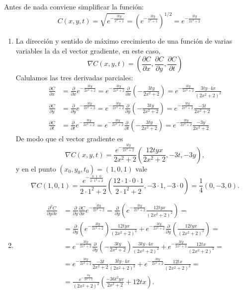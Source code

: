 {Antes de nada conviene simplificar la función:
\[
C(x,y,t) = \sqrt{e^{-\frac{3ty}{x^2+1}}} = \left(e^{-\frac{3ty}{x^2+1}}\right)^{1/2} = e^{-\frac{3ty}{2x^2+2}}
\]
\begin{enumerate}
\item La dirección y sentido de máximo crecimiento de una función de varias variables la da el vector gradiente, en este caso,
\[
\nabla C(x,y,t) =\left(\frac{\partial C}{\partial x}, \frac{\partial C}{\partial y}, \frac{\partial C}{\partial t} \right)
\]
Calulamos las tres derivadas parciales:
\begin{align*}
\frac{\partial C}{\partial x} &= \frac{\partial}{\partial x} e^{-\frac{3ty}{2x^2+2}} = e^{-\frac{3ty}{2x^2+2}} \frac{\partial}{\partial x}\left(-\frac{3ty}{2x^2+2}\right) = e^{-\frac{3ty}{2x^2+2}}\frac{3ty\cdot 4x}{(2x^2+2)^2} \\
\frac{\partial C}{\partial y} &= \frac{\partial}{\partial y} e^{-\frac{3ty}{2x^2+2}} = e^{-\frac{3ty}{2x^2+2}} \frac{\partial}{\partial y}\left(-\frac{3ty}{2x^2+2}\right) = e^{-\frac{3ty}{2x^2+2}}\frac{-3t}{2x^2+2} \\
\frac{\partial C}{\partial t} &= \frac{\partial}{\partial t} e^{-\frac{3ty}{2x^2+2}} = e^{-\frac{3ty}{2x^2+2}} \frac{\partial}{\partial t}\left(-\frac{3ty}{2x^2+2}\right) = e^{-\frac{3ty}{2x^2+2}}\frac{-3y}{2x^2+2}
\end{align*}
De modo que el vector gradiente es
\[
\nabla C(x,y,t) =\frac{e^{-\frac{3ty}{2x^2+2}}}{2x^2+2}\left(\frac{12tyx}{2x^2+2}, -3t, -3y\right),
\] 
y en el punto $(x_0,y_0,t_0)=(1,0,1)$ vale
\[
\nabla C(1,0,1) =\frac{e^{-\frac{3\cdot 1\cdot 0}{2\cdot 1^2+2}}}{2\cdot 1^2+2}\left(\frac{12\cdot 1\cdot 0\cdot 1}{2\cdot 1^2+2}, -3\cdot 1, -3\cdot 0\right) = \frac{1}{4}(0,-3,0).
\] 

\item
\begin{align*}
\frac{\partial^2 C}{\partial y\partial x} &= \frac{\partial}{\partial y}\frac{\partial C}{\partial x} e^{-\frac{3ty}{2x^2+2}} = \frac{\partial}{\partial y}  \left(e^{-\frac{3ty}{2x^2+2}}\frac{12tyx}{(2x^2+2)^2}\right) = \\
&= \frac{\partial}{\partial y} \left(e^{-\frac{3ty}{2x^2+2}}\right)\frac{12tyx}{(2x^2+2)^2}+e^{-\frac{3ty}{2x^2+2}}\frac{\partial}{\partial y}\left(\frac{12tyx}{(2x^2+2)^2}\right) = \\
&= e^{-\frac{3ty}{2x^2+2}}\frac{\partial}{\partial y}\left(-\frac{3ty}{2x^2+2}\right)\frac{3ty\cdot 4x}{(2x^2+2)^2}+e^{-\frac{3ty}{2x^2+2}}\frac{12tx}{(2x^2+2)^2} = \\
&= e^{-\frac{3ty}{2x^2+2}}\frac{-3t}{2x^2+2}\frac{3ty\cdot 4x}{(2x^2+2)^2}+e^{-\frac{3ty}{2x^2+2}}\frac{12tx}{(2x^2+2)^2} = \\
&= \frac{e^{-\frac{3ty}{2x^2+2}}}{(2x^2+2)^2}\left(\frac{-36t^2yx}{2x^2+2}+12tx\right).
\end{align*}


\end{enumerate}}
